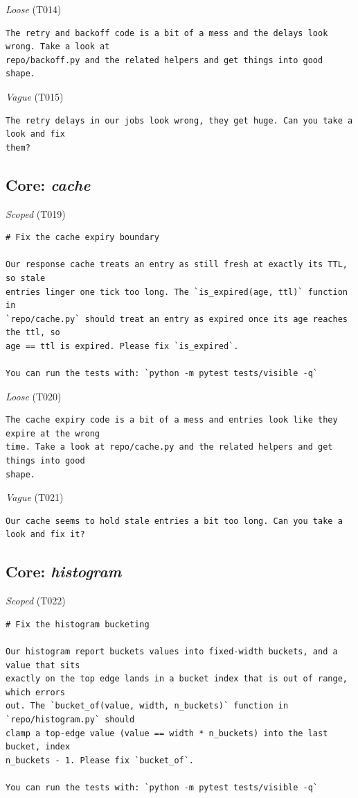 \noindent\textit{Loose} (T014)
\begin{Verbatim}[fontsize=\footnotesize,frame=leftline,xleftmargin=1em]
The retry and backoff code is a bit of a mess and the delays look wrong. Take a look at
repo/backoff.py and the related helpers and get things into good shape.
\end{Verbatim}

\noindent\textit{Vague} (T015)
\begin{Verbatim}[fontsize=\footnotesize,frame=leftline,xleftmargin=1em]
The retry delays in our jobs look wrong, they get huge. Can you take a look and fix
them?
\end{Verbatim}

\subsection*{Core: \emph{cache}}
\noindent\textit{Scoped} (T019)
\begin{Verbatim}[fontsize=\footnotesize,frame=leftline,xleftmargin=1em]
# Fix the cache expiry boundary

Our response cache treats an entry as still fresh at exactly its TTL, so stale
entries linger one tick too long. The `is_expired(age, ttl)` function in
`repo/cache.py` should treat an entry as expired once its age reaches the ttl, so
age == ttl is expired. Please fix `is_expired`.

You can run the tests with: `python -m pytest tests/visible -q`
\end{Verbatim}

\noindent\textit{Loose} (T020)
\begin{Verbatim}[fontsize=\footnotesize,frame=leftline,xleftmargin=1em]
The cache expiry code is a bit of a mess and entries look like they expire at the wrong
time. Take a look at repo/cache.py and the related helpers and get things into good
shape.
\end{Verbatim}

\noindent\textit{Vague} (T021)
\begin{Verbatim}[fontsize=\footnotesize,frame=leftline,xleftmargin=1em]
Our cache seems to hold stale entries a bit too long. Can you take a look and fix it?
\end{Verbatim}

\subsection*{Core: \emph{histogram}}
\noindent\textit{Scoped} (T022)
\begin{Verbatim}[fontsize=\footnotesize,frame=leftline,xleftmargin=1em]
# Fix the histogram bucketing

Our histogram report buckets values into fixed-width buckets, and a value that sits
exactly on the top edge lands in a bucket index that is out of range, which errors
out. The `bucket_of(value, width, n_buckets)` function in `repo/histogram.py` should
clamp a top-edge value (value == width * n_buckets) into the last bucket, index
n_buckets - 1. Please fix `bucket_of`.

You can run the tests with: `python -m pytest tests/visible -q`
\end{Verbatim}

